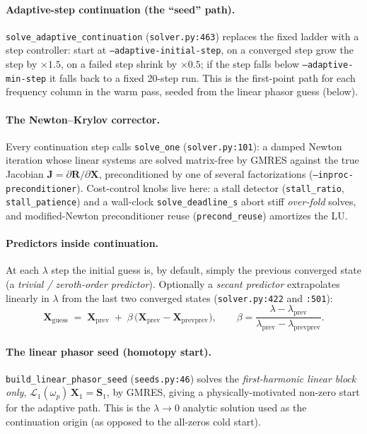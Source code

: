 \documentclass[11pt]{article}
\newcommand{\code}[1]{\texttt{\small #1}}
\newcommand{\Res}{\mathbf{R}}
\newcommand{\Xv}{\mathbf{X}}
\newcommand{\Jac}{\mathbf{J}}
\begin{document}
\paragraph{Adaptive-step continuation (the ``seed'' path).}
\code{solve\_adaptive\_continuation} (\code{solver.py:463}) replaces the fixed
ladder with a step controller: start at \code{--adaptive-initial-step}, on a
converged step grow the step by $\times 1.5$, on a failed step shrink by
$\times 0.5$; if the step falls below \code{--adaptive-min-step} it falls back to
a fixed 20-step run. This is the first-point path for each frequency column in
the warm pass, seeded from the linear phasor guess (below).

\paragraph{The Newton--Krylov corrector.}
Every continuation step calls \code{solve\_one} (\code{solver.py:101}): a damped
Newton iteration whose linear systems are solved matrix-free by GMRES against
the true Jacobian $\Jac = \partial\Res/\partial\Xv$, preconditioned by one of
several factorizations (\code{--inproc-preconditioner}). Cost-control knobs live
here: a stall detector (\code{stall\_ratio}, \code{stall\_patience}) and a
wall-clock \code{solve\_deadline\_s} abort stiff \emph{over-fold} solves, and
modified-Newton preconditioner reuse (\code{precond\_reuse}) amortizes the LU.

\paragraph{Predictors inside continuation.}
At each $\lambda$ step the initial guess is, by default, simply the previous
converged state (a \emph{trivial / zeroth-order predictor}). Optionally a
\emph{secant predictor} extrapolates linearly in $\lambda$ from the last two
converged states (\code{solver.py:422} and \code{:501}):
\begin{equation}
  \Xv_{\text{guess}} \;=\; \Xv_{\text{prev}}
    \;+\; \beta\,\bigl(\Xv_{\text{prev}} - \Xv_{\text{prevprev}}\bigr),
  \qquad
  \beta = \frac{\lambda - \lambda_{\text{prev}}}
               {\lambda_{\text{prev}} - \lambda_{\text{prevprev}}} .
  \label{eq:secant}
\end{equation}

\paragraph{The linear phasor seed (homotopy start).}
\code{build\_linear\_phasor\_seed} (\code{seeds.py:46}) solves the
\emph{first-harmonic linear block only}, $\mathcal{L}_1(\omega_p)\,\Xv_1 =
\mathbf{S}_1$, by GMRES, giving a physically-motivated non-zero start for the
adaptive path. This is the $\lambda \to 0$ analytic solution used as the
continuation origin (as opposed to the all-zeros cold start).
\end{document}

